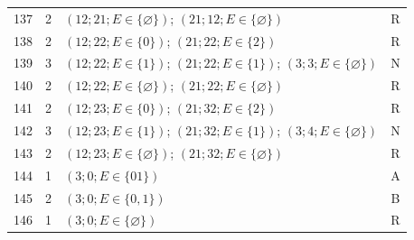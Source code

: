 \begin{longtable}{@{}r r p{10.1cm} c@{}}
137 & 2 & $(12;21;E\in\{\varnothing\})$; $(21;12;E\in\{\varnothing\})$ & R\\[1mm]
138 & 2 & $(12;22;E\in\{0\})$; $(21;22;E\in\{2\})$ & R\\[1mm]
139 & 3 & $(12;22;E\in\{1\})$; $(21;22;E\in\{1\})$; $(3;3;E\in\{\varnothing\})$ & N\\[1mm]
140 & 2 & $(12;22;E\in\{\varnothing\})$; $(21;22;E\in\{\varnothing\})$ & R\\[1mm]
141 & 2 & $(12;23;E\in\{0\})$; $(21;32;E\in\{2\})$ & R\\[1mm]
142 & 3 & $(12;23;E\in\{1\})$; $(21;32;E\in\{1\})$; $(3;4;E\in\{\varnothing\})$ & N\\[1mm]
143 & 2 & $(12;23;E\in\{\varnothing\})$; $(21;32;E\in\{\varnothing\})$ & R\\[1mm]
144 & 1 & $(3;0;E\in\{01\})$ & A\\[1mm]
145 & 2 & $(3;0;E\in\{0,1\})$ & B\\[1mm]
146 & 1 & $(3;0;E\in\{\varnothing\})$ & R\\[1mm]
\end{longtable}


